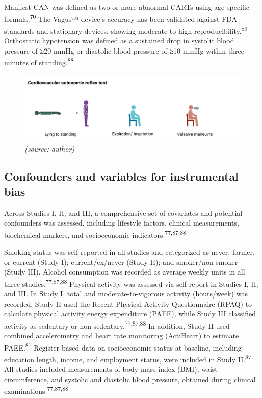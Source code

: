 \documentclass[
  a4paper,
  headsepline=true,
  open=any]{scrbook}
\begin{document}
Manifest CAN was defined as two or more abnormal CARTs using
age-specific formula.\textsuperscript{70} The Vagus™ device's accuracy
has been validated against FDA standards and stationary devices, showing
moderate to high reproducibility.\textsuperscript{89} Orthostatic
hypotension was defined as a sustained drop in systolic blood pressure
of ≥20 mmHg or diastolic blood pressure of ≥10 mmHg within three minutes
of standing.\textsuperscript{88}

\begin{figure}

\begin{minipage}[t]{\linewidth}

{\centering 

\includegraphics{images/cart.png} \emph{(source: author)}

}

\end{minipage}%

\end{figure}

\hypertarget{confounders-and-variables-for-instrumental-bias}{%
\subsection{Confounders and variables for instrumental
bias}\label{confounders-and-variables-for-instrumental-bias}}

Across Studies I, II, and III, a comprehensive set of covariates and
potential confounders was assessed, including lifestyle factors,
clinical measurements, biochemical markers, and socioeconomic
indicators.\textsuperscript{77,87,88}

Smoking status was self-reported in all studies and categorized as
never, former, or current (Study I); current/ex/never (Study II); and
smoker/non-smoker (Study III). Alcohol consumption was recorded as
average weekly units in all three studies.\textsuperscript{77,87,88}
Physical activity was assessed via self-report in Studies I, II, and
III. In Study I, total and moderate-to-vigorous activity (hours/week)
was recorded. Study II used the Recent Physical Activity Questionnaire
(RPAQ) to calculate physical activity energy expenditure (PAEE), while
Study III classified activity as sedentary or
non-sedentary.\textsuperscript{77,87,88} In addition, Study II used
combined accelerometry and heart rate monitoring (ActiHeart) to estimate
PAEE.\textsuperscript{87} Register-based data on socioeconomic status at
baseline, including education length, income, and employment status,
were included in Study II.\textsuperscript{87} All studies included
measurements of body mass index (BMI), waist circumference, and systolic
and diastolic blood pressure, obtained during clinical
examinations.\textsuperscript{77,87,88}
\end{document}
